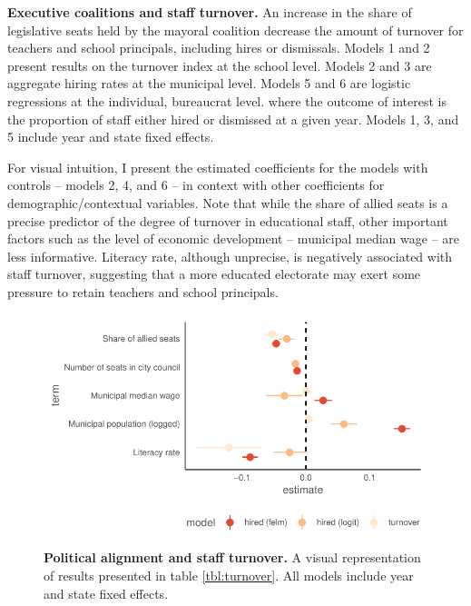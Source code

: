 \begin{landscape}
    \begin{table}[t]
      \centering
      \footnotesize
      
      \caption{{\bf Executive coalitions and staff turnover.} An increase in the share of legislative seats held by the mayoral coalition decrease the amount of turnover for teachers and school principals, including hires or dismissals. Models 1 and 2 present results on the turnover index at the school level. Models 2 and 3 are aggregate hiring rates at the municipal level. Models 5 and 6 are logistic regressions at the individual, bureaucrat level. where the outcome of interest is the proportion of staff either hired or dismissed at a given year. Models 1, 3, and 5 include year and state fixed effects.}
      \label{tbl:turnover}
    \end{table}
\end{landscape}

For visual intuition, I present the estimated coefficients for the models with controls -- models 2, 4, and 6 -- in context with other coefficients for demographic/contextual variables. Note that while the share of allied seats is a precise predictor of the degree of turnover in educational staff, other important factors such as the level of economic development -- municipal median wage -- are less informative. Literacy rate, although unprecise, is negatively associated with staff turnover, suggesting that a more educated electorate may exert some pressure to retain teachers and school principals. 

\begin{figure}[h]
    \centering
    \includegraphics[width=0.6\linewidth]{chapters/chapter_1/plots/plot_coalition_coef_mun.pdf}
    \caption{{\bf Political alignment and staff turnover.} A visual representation of results presented in table \ref{tbl:turnover}. All models include year and state fixed effects.}
    \label{fig:coalition_turnover}
\end{figure}

